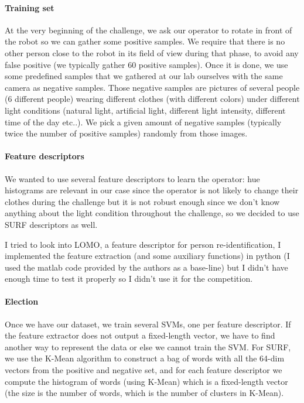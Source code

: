 \documentclass[a4paper, twocolumn]{article}
\begin{document}
    \paragraph{Training set} At the very beginning of the challenge, we ask our operator to rotate in front of the robot so we can gather some positive samples. We require that there is no other person close to the robot in its field of view during that phase, to avoid any false positive (we typically gather 60 positive samples). Once it is done, we use some predefined samples that we gathered at our lab ourselves with the same camera as negative samples. Those negative samples are pictures of several people (6 different people) wearing different clothes (with different colors) under different light conditions (natural light, artificial light, different light intensity, different time of the day etc..). We pick a given amount of negative samples (typically twice the number of positive samples) randomly from those images.
    
    \paragraph{Feature descriptors} We wanted to use several feature descriptors to learn the operator: hue histograms are relevant in our case since the operator is not likely to change their clothes during the challenge but it is not robust enough since we don't know anything about the light condition throughout the challenge, so we decided to use SURF descriptors as well. 
    
    I tried to look into LOMO\cite{2014arXiv1406.4216L}, a feature descriptor for person re-identification, I implemented the feature extraction (and some auxiliary functions) in python (I used the matlab code provided by the authors as a base-line) but I didn't have enough time to test it properly so I didn't use it for the competition.
    
    \paragraph{Election} Once we have our dataset, we train several SVMs, one per feature descriptor. If the feature extractor does not output a fixed-length vector, we have to find another way to represent the data or else we cannot train the SVM. For SURF, we use the K-Mean algorithm to construct a bag of words with all the 64-dim vectors from the positive and negative set, and for each feature descriptor we compute the histogram of words (using K-Mean) which is a fixed-length vector (the size is the number of words, which is the number of clusters in K-Mean).
    
\end{document}
